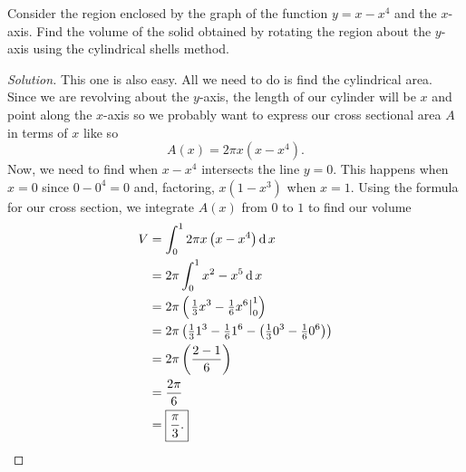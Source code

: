 \begin{problem}
Consider the region enclosed by the graph of the function $y=x-x^4$ and the
$x$-axis. Find the volume of the solid obtained by rotating the region
about the $y$-axis using the cylindrical shells method.
\end{problem}
\begin{proof}[Solution]
This one is also easy. All we need to do is find the cylindrical
area. Since we are revolving about the $y$-axis, the length of our
cylinder will be $x$ and point along the $x$-axis so we probably want to
express our cross sectional area $A$ in terms of $x$ like so
\[
A(x)=2\pi x(x-x^4).
\]
Now, we need to find when $x-x^4$ intersects the line $y=0$. This happens
when $x=0$ since $0-0^4=0$ and, factoring, $x(1-x^3)$ when $x=1$. Using the
formula for our cross section, we integrate $A(x)$ from $0$ to $1$ to find
our volume
\begin{align*}
V&=\int_0^12\pi x\left(x-x^4\right)\operatorname{d} x\\
&=2\pi\int_0^1x^2-x^5\operatorname{d} x\\
&=2\pi\left(\left.\tfrac{1}{3}x^3-\tfrac{1}{6}x^6\right|_0^1\right)\\
&=2\pi\left(\tfrac{1}{3}1^3-\tfrac{1}{6}1^6-\left(\tfrac{1}{3}0^3-\tfrac{1}{6}0^6\right)\right)\\
&=2\pi\left(\frac{2-1}{6}\right)\\
&=\frac{2\pi}{6}\\
&=\boxed{\frac{\pi}{3}.}\qedhere
\end{align*}
\end{proof}

